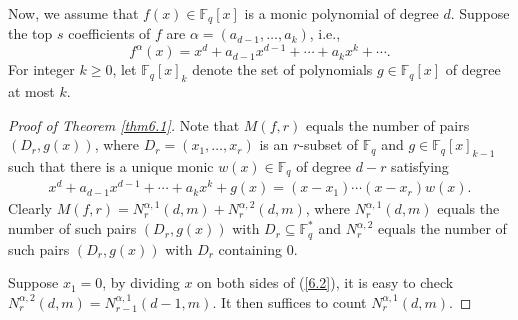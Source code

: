 \documentclass[reqno]{amsart}
\theoremstyle{remark}
\numberwithin{equation}{section}
\newcommand{\f}{\mathbb{F}_q}
\begin{document}
Now, we assume that $f(x)\in \f[x]$ is a monic polynomial of degree $d$.
Suppose the top $s$ coefficients of $f$ are $\alpha=(a_{d-1}, \ldots, a_{k})$, i.e., $$f^{\alpha}(x)=x^d+a_{d-1}
x^{d-1}+\cdots+a_{k}x^{k}+\cdots.$$
For integer $k\geq 0$, let $\f[x]_k$ denote the set of polynomials $g\in \f[x]$ of degree at most $k$.

\begin{proof}[Proof of Theorem \ref{thm6.1}]
Note that $M(f,r)$ equals the number of
pairs $(D_r, g(x))$, where $D_r=(x_1,\ldots, x_r)$ is an $r$-subset of $\f$ and $g \in \f[x]_{k-1}$
such that there is a unique monic $w(x) \in \f$ of degree $d-r$ satisfying
 \begin{align} x^d+a_{d-1}x^{d-1}+\cdots+a_{k}x^{k}+g(x)=(x-x_1)\cdots(x-x_r)w(x). \label{6.2}
  \end{align}
Clearly $M(f,r)=N_r^{\alpha, 1}(d, m)+N_r^{\alpha, 2}(d, m)$, where $N_r^{\alpha, 1}(d,m)$
 equals the number of such pairs  $(D_r, g(x))$ with $D_r \subseteq \f^*$
 and   $N_r^{\alpha, 2}$ equals the number of such pairs $(D_r, g(x))$ with $D_r$ containing $0$.

Suppose $x_1=0$, by dividing $x$ on both sides of (\ref{6.2}), it is easy to check $N_r^{\alpha, 2}(d, m)=N_{r-1}^{\alpha, 1}(d-1, m)$.  It then suffices to count  $N_r^{\alpha, 1}(d, m)$.


\end{proof}
\end{document}
